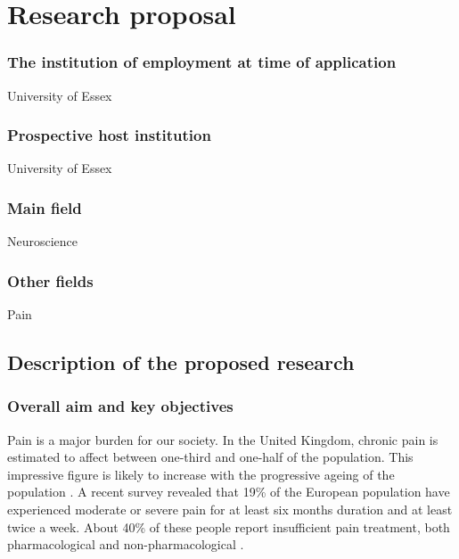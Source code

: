 \documentclass[twocolumn, serif, rga, numeric]{jote-article}
\begin{document}
\section*{Research proposal}



\subsubsection*{The institution of employment at time of application}


University of Essex


\subsubsection*{Prospective host institution}


University of Essex


\subsubsection*{Main field}


Neuroscience


\subsubsection*{Other fields}


Pain


\subsection*{Description of the proposed research}



\subsubsection*{Overall aim and key objectives}


Pain is a major burden for our society. In the United Kingdom, chronic
pain is estimated to affect between one-third and one-half of the
population. This impressive figure is likely to increase with the
progressive ageing of the population \cite{Fayaz2016}. A recent survey
revealed that 19\% of the European population have experienced moderate
or severe pain for at least six months duration and at least twice a
week. About 40\% of these people report insufficient pain treatment,
both pharmacological and non-pharmacological \cite{Breivik2006}.
\end{document}
